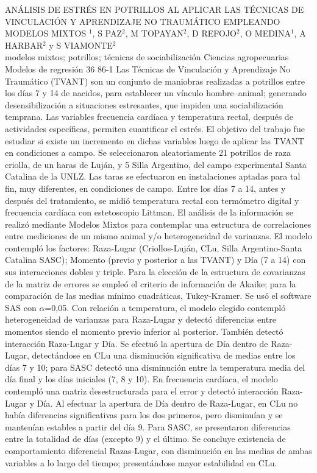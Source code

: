 \A
{ANÁLISIS DE ESTRÉS EN POTRILLOS AL APLICAR LAS TÉCNICAS DE VINCULACIÓN Y APRENDIZAJE NO TRAUMÁTICO EMPLEANDO MODELOS MIXTOS}
{$^1$, S PAZ$^2$, M TOPAYAN$^2$, D REFOJO$^2$, O MEDINA$^1$, A HARBAR$^2$  y S VIAMONTE$^2$ }
{
\\}
{modelos mixtos; potrillos; técnicas de sociabilización} 
 {Ciencias agropecuarias} 
 {Modelos de regresión} 
 {36} 
 {86-1}
{Las Técnicas de Vinculación y Aprendizaje No Traumático (TVANT) son un conjunto de maniobras realizadas a potrillos entre los días 7 y 14 de nacidos, para establecer un vínculo hombre–animal; generando desensibilización a situaciones estresantes, que impiden una sociabilización temprana. Las variables frecuencia cardíaca y temperatura rectal, después de actividades específicas, permiten cuantificar el estrés. El objetivo del trabajo fue estudiar si existe un incremento en dichas variables luego de aplicar las TVANT en condiciones a campo. Se seleccionaron aleatoriamente 21 potrillos de raza criolla, de un haras de Luján, y 5 Silla Argentino, del campo experimental Santa Catalina de la UNLZ. Las taras se efectuaron en instalaciones aptadas para tal fin, muy diferentes, en condiciones de campo. Entre los días 7 a 14, antes y después del tratamiento, se midió temperatura rectal con termómetro digital y frecuencia cardíaca con estetoscopio Littman. El análisis de la información se realizó mediante Modelos Mixtos para contemplar una estructura de correlaciones entre mediciones de un mismo animal y/o heterogeneidad de varianzas. El modelo contempló los factores: Raza-Lugar (Criollos-Luján, CLu, Silla Argentino-Santa Catalina SASC); Momento (previo y posterior a las TVANT) y Día (7 a 14) con sus interacciones dobles y triple. Para la elección de la estructura de covarianzas de la matriz de errores se empleó el criterio de información de Akaike; para la comparación de las medias mínimo cuadráticas, Tukey-Kramer. Se usó el software SAS con $\alpha$=0,05. Con relación a temperatura, el modelo elegido contempló heterogeneidad de varianzas para Raza-Lugar y detectó diferencias entre momentos siendo el momento previo inferior al posterior. También detectó interacción Raza-Lugar y Día. Se efectuó la apertura de Día dentro de Raza-Lugar, detectándose en CLu una disminución significativa de medias entre los días 7 y 10; para SASC detectó una disminución entre la temperatura media del día final y los días iniciales (7, 8 y 10). En frecuencia cardíaca, el modelo contempló una matriz desestructurada para el error y detectó interacción Raza-Lugar y Día. Al efectuar la apertura de Día dentro de Raza-Lugar, en CLu no había diferencias significativas para los dos primeros, pero disminuían y se mantenían estables a partir del día 9. Para SASC, se presentaron diferencias entre la totalidad de días (excepto 9) y el último. Se concluye existencia de comportamiento diferencial Razas-Lugar, con disminución en las medias de ambas variables a lo largo del tiempo; presentándose mayor estabilidad en CLu.}
